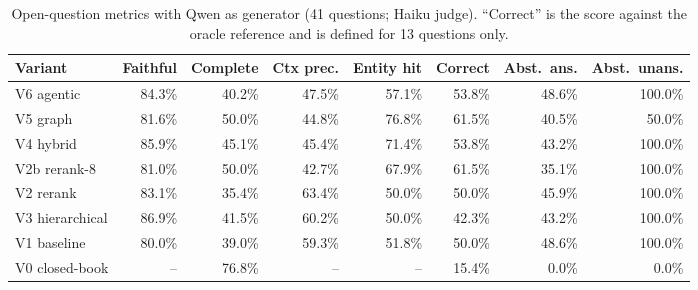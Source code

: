 \documentclass[11pt,a4paper]{article}
\begin{document}
\begin{table}[h]\centering\footnotesize
\caption{Haiku and Qwen as generators (24 counterfactual questions; open-question abstention). ``Judge'' is the Haiku semantic judge, ``strict'' the string match. Spearman rank correlation between the Haiku and Qwen rankings: 0.97 (judge) and 0.87 (strict).}
\end{table}

\begin{table}[h]\centering\footnotesize
\caption{Open-question metrics with Qwen as generator (41 questions; Haiku judge). ``Correct'' is the score against the oracle reference and is defined for 13 questions only.}
\begin{tabular}{@{}lrrrrrrr@{}}\toprule
Variant & Faithful & Complete & Ctx prec. & Entity hit & Correct & Abst.\ ans. & Abst.\ unans.\\\midrule
V6 agentic & 84.3\% & 40.2\% & 47.5\% & 57.1\% & 53.8\% & 48.6\% & 100.0\% \\
V5 graph & 81.6\% & 50.0\% & 44.8\% & 76.8\% & 61.5\% & 40.5\% & 50.0\% \\
V4 hybrid & 85.9\% & 45.1\% & 45.4\% & 71.4\% & 53.8\% & 43.2\% & 100.0\% \\
V2b rerank-8 & 81.0\% & 50.0\% & 42.7\% & 67.9\% & 61.5\% & 35.1\% & 100.0\% \\
V2 rerank & 83.1\% & 35.4\% & 63.4\% & 50.0\% & 50.0\% & 45.9\% & 100.0\% \\
V3 hierarchical & 86.9\% & 41.5\% & 60.2\% & 50.0\% & 42.3\% & 43.2\% & 100.0\% \\
V1 baseline & 80.0\% & 39.0\% & 59.3\% & 51.8\% & 50.0\% & 48.6\% & 100.0\% \\
V0 closed-book & -- & 76.8\% & -- & -- & 15.4\% & 0.0\% & 0.0\% \\
\bottomrule\end{tabular}
\end{table}
\end{document}
